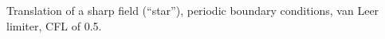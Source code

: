 Translation of a sharp field (``star''), periodic boundary conditions, van Leer limiter, CFL of 0.5.
